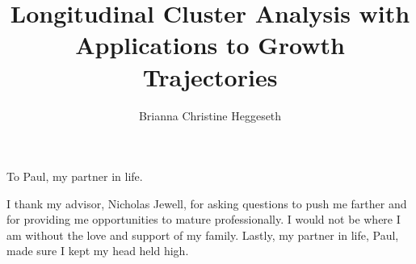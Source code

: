 \documentclass{ucbthesis}
\begin{document}

\title{Longitudinal Cluster Analysis with Applications to Growth Trajectories}
\author{Brianna Christine Heggeseth}



\maketitle
\approvalpage
\copyrightpage

%

\begin{frontmatter}

\begin{dedication}
\null\vfil
\begin{center}
To Paul, my partner in life.\\\vspace{12pt}

\end{center}
\vfil\null
\end{dedication}

\clearpage
\clearpage

\begin{acknowledgements}
I thank my advisor, Nicholas Jewell, for asking questions to push me farther and for providing me opportunities to mature professionally. I would not be where I am without the love and support of my family. Lastly, my partner in life, Paul, made sure I kept my head held high.
\end{acknowledgements}

\end{frontmatter}

\pagestyle{headings}



%
%
%
%
%
%



\appendix
% 
%
%
\end{document}
